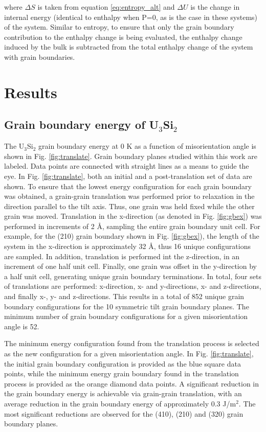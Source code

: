 \documentclass[review]{elsarticle}
\begin{document}
where $\Delta S$ is taken from equation \ref{eq:entropy_alt} and $\Delta U$ is the change in internal energy (identical to enthalpy when P=0, as is the case in these systems) of the system. Similar to entropy, to ensure that only the grain boundary contribution to the enthalpy change is being evaluated, the enthalpy change induced by the bulk is subtracted from the total enthalpy change of the system with grain boundaries.

\section{Results}
\subsection{Grain boundary energy of U$_{3}$Si$_{2}$}

The U$_{3}$Si$_{2}$ grain boundary energy at 0 K as a function of misorientation angle is shown in Fig. \ref{fig:translate}. Grain boundary planes studied within this work are labeled. Data points are connected with straight lines as a means to guide the eye. In Fig. \ref{fig:translate}, both an initial and a post-translation set of data are shown. To ensure that the lowest energy configuration for each grain boundary was obtained, a grain-grain translation was performed prior to relaxation in the direction parallel to the tilt axis. Thus, one grain was held fixed while the other grain was moved. Translation in the x-direction (as denoted in Fig. \ref{fig:gbex}) was performed in increments of 2 {\AA}, sampling the entire grain boundary unit cell. For example, for the (210) grain boundary shown in Fig. \ref{fig:gbex}), the length of the system in the x-direction is approximately 32 {\AA}, thus 16 unique configurations are sampled. In addition, translation is performed int the z-direction, in an increment of one half unit cell. Finally, one grain was offset in the y-direction by a half unit cell,  generating unique grain boundary terminations. In total, four sets of translations are performed: x-direction, x- and y-directions, x- and z-directions, and finally x-, y- and z-directions. This results in a total of 852 unique grain boundary configurations for the 10 symmetric tilt grain boundary planes. The minimum number of grain boundary configurations for a given misorientation angle is 52. 

The minimum energy configuration found from the translation process is selected as the new configuration for a given misorientation angle. In Fig. \ref{fig:translate}, the initial grain boundary configuration is provided as the blue square data points, while the minimum energy grain boundary found in the translation process is provided as the orange diamond data points. A significant reduction in the grain boundary energy is achievable via grain-grain translation, with an average reduction in the grain boundary energy of approximately 0.3 J/m$^{2}$. The most significant reductions are observed for the (410), (210) and (320) grain boundary planes. 
\end{document}
